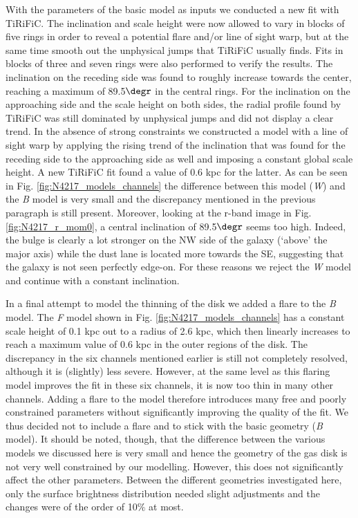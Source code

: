 \documentclass{aa}
\begin{document}
%
\par
With the parameters of the basic model as inputs we conducted a new fit with TiRiFiC. The inclination and scale height were now allowed to vary in blocks of five rings in order to reveal a potential flare and/or line of sight warp, but at the same time smooth out the unphysical jumps that TiRiFiC usually finds. Fits in blocks of three and seven rings were also performed to verify the results. The inclination on the receding side was found to roughly increase towards the center, reaching a maximum of 89.5$\degr$ in the central rings. For the inclination on the approaching side and the scale height on both sides, the radial profile found by TiRiFiC was still dominated by unphysical jumps and did not display a clear trend. In the absence of strong constraints we constructed a model with a line of sight warp by applying the rising trend of the inclination that was found for the receding side to the approaching side as well and imposing a constant global scale height. A new TiRiFiC fit found a value of 0.6 kpc for the latter. As can be seen in Fig. \ref{fig:N4217_models_channels} the difference between this model (\emph{W}) and the \textit{B} model is very small and the discrepancy mentioned in the previous paragraph is still present. Moreover, looking at the r-band image in Fig. \ref{fig:N4217_r_mom0}, a central inclination of 89.5$\degr$ seems too high. Indeed, the bulge is clearly a lot stronger on the NW side of the galaxy (`above' the major axis) while the dust lane is located more towards the SE, suggesting that the galaxy is not seen perfectly edge-on. For these reasons we reject the \emph{W} model and continue with a constant inclination.
\par
In a final attempt to model the thinning of the disk we added a flare to the \emph{B} model. The \emph{F} model shown in Fig. \ref{fig:N4217_models_channels} has a constant scale height of 0.1 kpc out to a radius of 2.6 kpc, which then linearly increases to reach a maximum value of 0.6 kpc in the outer regions of the disk. The discrepancy in the six channels mentioned earlier is still not completely resolved, although it is (slightly) less severe. However, at the same level as this flaring model improves the fit in these six channels, it is now too thin in many other channels. Adding a flare to the model therefore introduces many free and poorly constrained parameters without significantly improving the quality of the fit. We thus decided not to include a flare and to stick with the basic geometry (\textit{B} model). It should be noted, though, that the difference between the various models we discussed here is very small and hence the geometry of the gas disk is not very well constrained by our modelling. However, this does not significantly affect the other parameters. Between the different geometries investigated here, only the surface brightness distribution needed slight adjustments and the changes were of the order of 10$\%$ at most.
\end{document}
